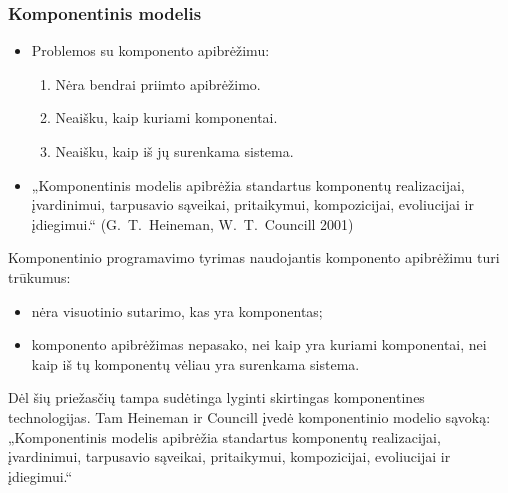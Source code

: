 \begin{frame}
  \frametitle{Komponentinis modelis}
  \begin{itemize}
    \item Problemos su komponento apibrėžimu:
      \begin{enumerate}
        \item Nėra bendrai priimto apibrėžimo.
        \item Neaišku, kaip kuriami komponentai.
        \item Neaišku, kaip iš jų surenkama sistema.
      \end{enumerate}
    \item „Komponentinis modelis apibrėžia standartus komponentų
      realizacijai, įvardinimui, tarpusavio sąveikai, pritaikymui,
      kompozicijai, evoliucijai ir įdiegimui.“ (\mbox{G. T. Heineman},
      \mbox{W. T. Councill} 2001)
  \end{itemize}
  \begin{handout}
    Komponentinio programavimo tyrimas naudojantis komponento apibrėžimu
    turi trūkumus:
    \begin{itemize}
      \item nėra visuotinio sutarimo, kas yra komponentas;
      \item komponento apibrėžimas nepasako, nei kaip yra kuriami
        komponentai, nei kaip iš tų komponentų vėliau yra surenkama
        sistema.
    \end{itemize}
    Dėl šių priežasčių tampa sudėtinga lyginti skirtingas
    komponentines technologijas. Tam Heineman ir Councill įvedė
    komponentinio modelio sąvoką:
    „Komponentinis modelis apibrėžia standartus komponentų
    realizacijai, įvardinimui, tarpusavio sąveikai, pritaikymui,
    kompozicijai, evoliucijai ir įdiegimui.“
  \end{handout}
\end{frame}


